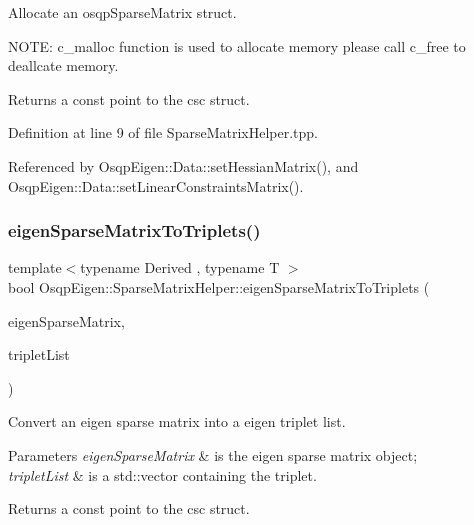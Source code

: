 Allocate an osqp\+Sparse\+Matrix struct. 

N\+O\+TE\+: {\ttfamily c\+\_\+malloc} function is used to allocate memory please call {\ttfamily c\+\_\+free} to deallcate memory. \begin{DoxyReturn}{Returns}
a const point to the csc struct. 
\end{DoxyReturn}


Definition at line 9 of file Sparse\+Matrix\+Helper.\+tpp.



Referenced by Osqp\+Eigen\+::\+Data\+::set\+Hessian\+Matrix(), and Osqp\+Eigen\+::\+Data\+::set\+Linear\+Constraints\+Matrix().

\mbox{\label{namespaceOsqpEigen_1_1SparseMatrixHelper_ae2383e6a41df66d2c34f61a8866af3e8}} 
\subsubsection{\texorpdfstring{eigen\+Sparse\+Matrix\+To\+Triplets()}{eigenSparseMatrixToTriplets()}}
{\footnotesize\ttfamily template$<$typename Derived , typename T $>$ \\
bool Osqp\+Eigen\+::\+Sparse\+Matrix\+Helper\+::eigen\+Sparse\+Matrix\+To\+Triplets (\begin{DoxyParamCaption}\item[{const Eigen\+::\+Sparse\+Compressed\+Base$<$ Derived $>$ \&}]{eigen\+Sparse\+Matrix,  }\item[{std\+::vector$<$ Eigen\+::\+Triplet$<$ T $>$$>$ \&}]{triplet\+List }\end{DoxyParamCaption})}



Convert an eigen sparse matrix into a eigen triplet list. 


\begin{DoxyParams}{Parameters}
{\em eigen\+Sparse\+Matrix} & is the eigen sparse matrix object; \\
\hline
{\em triplet\+List} & is a std\+::vector containing the triplet. \\
\hline
\end{DoxyParams}
\begin{DoxyReturn}{Returns}
a const point to the csc struct. 
\end{DoxyReturn}


